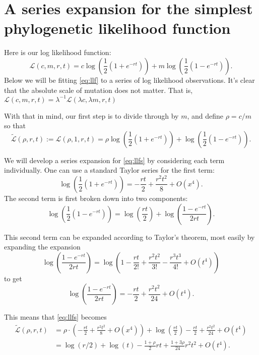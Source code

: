 \documentclass{amsart}
\newcommand{\llf}{\mathcal{L}}   %
\newcommand{\llfs}{\tilde{\llf}}
\begin{document}
\section{A series expansion for the simplest phylogenetic likelihood function}

Here is our log likelihood function:
\begin{equation}
  \llf(c,m,r,t) = c \log\left(\frac{1}{2}(1+e^{-rt})\right) + m \log\left(\frac{1}{2}(1-e^{-rt})\right).
  \label{eq:llf}
\end{equation}
Below we will be fitting \eqref{eq:llf} to a series of log likelihood observations.
It's clear that the absolute scale of mutation does not matter.
That is, $\llf(c,m,r,t) = \lambda^{-1} \llf(\lambda c,\lambda m,r,t)$

With that in mind, our first step is to divide through by $m$, and define $\rho = c/m$ so that
\begin{equation}
  \llfs(\rho,r,t) := \llf(\rho,1,r,t) = \rho \log \left(\frac{1}{2}(1+e^{-rt})\right) + \log \left(\frac{1}{2}(1-e^{-rt})\right).
  \label{eq:llfs}
\end{equation}

We will develop a series expansion for \eqref{eq:llfs} by considering each term individually.
One can use a standard Taylor series for the first term:
\begin{equation}
  \log \left(\frac{1}{2}(1+e^{-rt})\right) = - \frac{rt}{2} + \frac{r^2 t^2}{8} + O(x^4).
\end{equation}
The second term is first broken down into two components:
\begin{equation}
  \log \left(\frac{1}{2}(1-e^{-rt})\right) = \log \left(\frac{rt}{2} \right) + \log \left(\frac{1-e^{-rt}}{2 rt}\right).
\end{equation}

This second term can be expanded according to Taylor's theorem, most easily by expanding the expansion
\[
  \log \left(\frac{1-e^{-rt}}{2 rt}\right) = \log \left(1 - \frac{rt}{2!} + \frac{r^2 t^2}{3!} - \frac{r^3 t^3}{4!} + O(t^4) \right)
\]
to get
\[
  \log \left(\frac{1-e^{-rt}}{2 rt}\right) = - \frac{rt}{2} + \frac{r^2 t^2}{24} + O(t^4).
\]

This means that \eqref{eq:llfs} becomes
\[
  \begin{split}
    \llfs(\rho,r,t) & = \rho \cdot \left(-\frac{rt}{2} + \frac{r^2 t^2}{8} + O(x^4) \right) + \log \left(\frac{rt}{2} \right) - \frac{rt}{2} + \frac{r^2 t^2}{24} + O(t^4)\\
    & = \log(r/2) + \log(t) - \frac{1+\rho}{2} r t + \frac{1+3 \rho}{24} r^2 t^2 + O(t^4).
  \end{split}
\]
\end{document}
